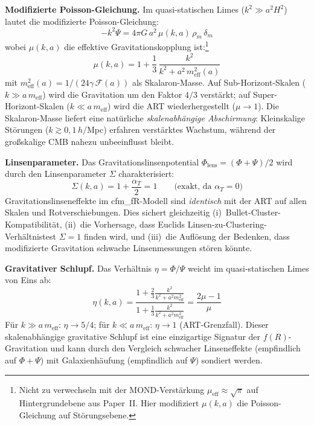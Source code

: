 \documentclass[11pt,a4paper]{article}
\begin{document}
\textbf{Modifizierte Poisson-Gleichung.} Im quasi-statischen Limes ($k^2 \gg a^2 H^2$) lautet die modifizierte Poisson-Gleichung:
\begin{equation}
-k^2 \Psi = 4\pi G\,a^2\,\mu(k,a)\,\rho_m\,\delta_m
\label{eq:modified_poisson}
\end{equation}
wobei $\mu(k,a)$ die effektive Gravitationskopplung ist:\footnote{Nicht zu verwechseln mit der MOND-Verst\"arkung $\mu_{\mathrm{eff}} \approx \sqrt{\pi}$ auf Hintergrundebene aus Paper~II. Hier modifiziert $\mu(k,a)$ die Poisson-Gleichung auf St\"orungsebene.}
\begin{equation}
{\mu(k,a) = 1 + \frac{1}{3}\,\frac{k^2}{k^2 + a^2\,m_{\mathrm{eff}}^2(a)}}
\label{eq:mu_ka}
\end{equation}
mit $m_{\mathrm{eff}}^2(a) = 1/(24\gamma\,\mathcal{F}(a))$ als Skalaron-Masse. Auf Sub-Horizont-Skalen ($k \gg a\,m_{\mathrm{eff}}$) wird die Gravitation um den Faktor $4/3$ verst\"arkt; auf Super-Horizont-Skalen ($k \ll a\,m_{\mathrm{eff}}$) wird die ART wiederhergestellt ($\mu \to 1$). Die Skalaron-Masse liefert eine nat\"urliche \textit{skalenabh\"angige Abschirmung}: Kleinskalige St\"orungen ($k \gtrsim 0{,}1\,h/$Mpc) erfahren verst\"arktes Wachstum, w\"ahrend der gro\ss skalige CMB nahezu unbeeinflusst bleibt.

\textbf{Linsenparameter.} Das Gravitationslinsenpotential $\Phi_{\mathrm{lens}} = (\Phi + \Psi)/2$ wird durch den Linsenparameter $\Sigma$ charakterisiert:
\begin{equation}
{\Sigma(k,a) = 1 + \frac{\alpha_T}{2} = 1 \qquad \text{(exakt, da $\alpha_T = 0$)}}
\label{eq:sigma_lensing}
\end{equation}
Gravitationslinseneffekte im cfm\_fR-Modell sind \textit{identisch} mit der ART auf allen Skalen und Rotverschiebungen. Dies sichert gleichzeitig (i)~Bullet-Cluster-Kompatibilit\"at, (ii)~die Vorhersage, dass Euclids Linsen-zu-Clustering-Verh\"altnistest $\Sigma = 1$ finden wird, und (iii)~die Aufl\"osung der Bedenken, dass modifizierte Gravitation schwache Linsenmessungen st\"oren k\"onnte.

\textbf{Gravitativer Schlupf.} Das Verh\"altnis $\eta = \Phi/\Psi$ weicht im quasi-statischen Limes von Eins ab:
\begin{equation}
\eta(k,a) = \frac{1 + \frac{2}{3}\frac{k^2}{k^2 + a^2 m_{\mathrm{eff}}^2}}{1 + \frac{1}{3}\frac{k^2}{k^2 + a^2 m_{\mathrm{eff}}^2}} = \frac{2\mu - 1}{\mu}
\end{equation}
F\"ur $k \gg a\,m_{\mathrm{eff}}$: $\eta \to 5/4$; f\"ur $k \ll a\,m_{\mathrm{eff}}$: $\eta \to 1$ (ART-Grenzfall). Dieser skalenabh\"angige gravitative Schlupf ist eine einzigartige Signatur der $f(R)$-Gravitation und kann durch den Vergleich schwacher Linseneffekte (empfindlich auf $\Phi + \Psi$) mit Galaxienh\"aufung (empfindlich auf $\Psi$) sondiert werden.
\end{document}
